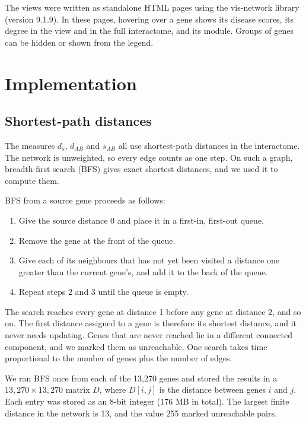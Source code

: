 \documentclass[11pt]{article}
\begin{document}
The views were written as standalone HTML pages using the vis-network library (version 9.1.9). In these pages, hovering over a gene shows its disease scores, its degree in the view and in the full interactome, and its module. Groups of genes can be hidden or shown from the legend.

\section{Implementation}

\subsection{Shortest-path distances}

The measures $d_s$, $d_{AB}$ and $s_{AB}$ all use shortest-path distances in the interactome. The network is unweighted, so every edge counts as one step. On such a graph, breadth-first search (BFS) gives exact shortest distances, and we used it to compute them.

BFS from a source gene proceeds as follows:

\begin{enumerate}
  \item Give the source distance 0 and place it in a first-in, first-out queue.
  \item Remove the gene at the front of the queue.
  \item Give each of its neighbours that has not yet been visited a distance one greater than the current gene's, and add it to the back of the queue.
  \item Repeat steps 2 and 3 until the queue is empty.
\end{enumerate}

The search reaches every gene at distance 1 before any gene at distance 2, and so on. The first distance assigned to a gene is therefore its shortest distance, and it never needs updating. Genes that are never reached lie in a different connected component, and we marked them as unreachable. One search takes time proportional to the number of genes plus the number of edges.

We ran BFS once from each of the 13,270 genes and stored the results in a $13{,}270 \times 13{,}270$ matrix $D$, where $D[i, j]$ is the distance between genes $i$ and $j$. Each entry was stored as an 8-bit integer (176 MB in total). The largest finite distance in the network is 13, and the value 255 marked unreachable pairs.
\end{document}
